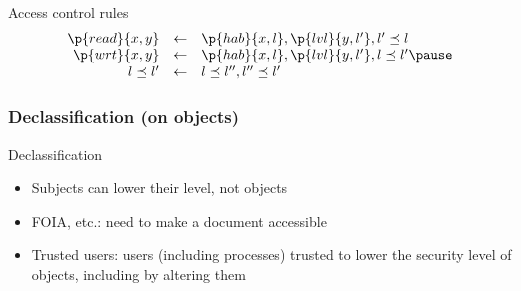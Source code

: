 \begin{reveals}
\begin{frame}
  \pause

  \begin{block}{Access control rules}
    $$
    \begin{array}{rcl}
      \p{read}{x,y} & \gets& \p{hab}{x,l}, \p{lvl}{y,l'}, l' \preceq l\\
      \p{wrt}{x,y} & \gets &\p{hab}{x,l}, \p{lvl}{y,l'}, l \preceq l' \pause\\
      l \preceq l' & \gets & l \preceq l'', l'' \preceq l'\\
    \end{array}
    $$
  \end{block}


\end{frame}









\begin{frame}
  \frametitle{Declassification (on objects)}

  \vfill

  \begin{block}{Declassification}
    \begin{itemize}
    \item Subjects can lower their level, not objects 
    \item FOIA, etc.: need to make a document accessible
    \item Trusted users: users (including processes) trusted to lower
      the security level of objects, including by altering them
    \end{itemize}
  \end{block}
  

\end{frame}
\end{reveals}
